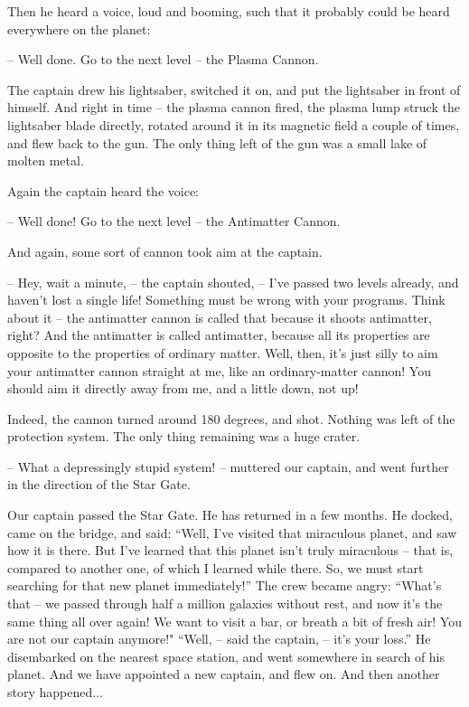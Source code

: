 \documentclass[ebook,twoside,final,openright]{memoir}
\begin{document}
\par
Then he heard a voice, loud and booming, such that it probably could be heard everywhere on the planet:\par
– Well done. Go to the next level – the Plasma Cannon.\par
The captain drew his lightsaber, switched it on, and put the lightsaber in front of himself. And right in time – the plasma cannon fired, the plasma lump struck the lightsaber blade directly, rotated around it in its magnetic field a couple of times, and flew back to the gun. The only thing left of the gun was a small lake of molten metal.\par
\par
Again the captain heard the voice:\par
– Well done! Go to the next level – the Antimatter Cannon.\par
And again, some sort of cannon took aim at the captain.\par
– Hey, wait a minute, – the captain shouted, – I’ve passed two levels already, and haven’t lost a single life! Something must be wrong with your programs. Think about it – the antimatter cannon is called that because it shoots antimatter, right? And the antimatter is called antimatter, because all its properties are opposite to the properties of ordinary matter. Well, then, it’s just silly to aim your antimatter cannon straight at me, like an ordinary-matter cannon! You should aim it directly away from me, and a little down, not up!\par
\par
Indeed, the cannon turned around 180 degrees, and shot. Nothing was left of the protection system. The only thing remaining was a huge crater.\par
– What a depressingly stupid system! – muttered our captain, and went further in the direction of the Star Gate.\par
\par
Our captain passed the Star Gate. He has returned in a few months. He docked, came on the bridge, and said: “Well, I’ve visited that miraculous planet, and saw how it is there. But I’ve learned that this planet isn’t truly miraculous – that is, compared to another one, of which I learned while there. So, we must start searching for that new planet immediately!” The crew became angry: “What’s that – we passed through half a million galaxies without rest, and now it’s the same thing all over again! We want to visit a bar, or breath a bit of fresh air! You are not our captain anymore!" “Well, – said the captain, – it’s your loss.” He disembarked on the nearest space station, and went somewhere in search of his planet. And we have appointed a new captain, and flew on. And then another story happened...
\end{document}
